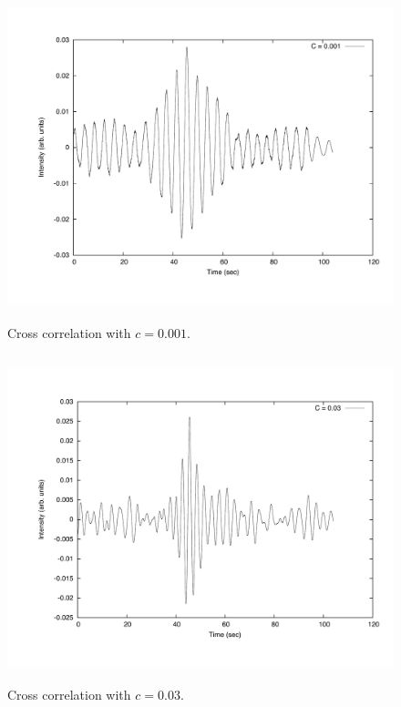 \documentclass[12pt]{article}
\begin{document}
\begin{figure}[!h]
\centering
\includegraphics[width =120 mm, height = 95mm]{Ex_6_25_cross.pdf}
\caption{Cross correlation with $c=0.001$.}
\label{fig:625}
\end{figure}
\begin{figure}[!h]
\centering
\includegraphics[width =120 mm, height = 95mm]{Ex_6_25_cross3.pdf}
\caption{Cross correlation with $c=0.03$.}
\label{fig:6253}
\end{figure}
\end{document}
